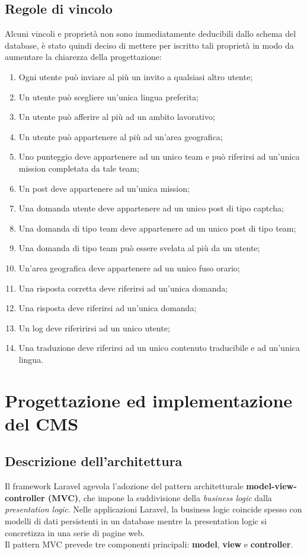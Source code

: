 \subsection{Regole di vincolo} %
Alcuni vincoli e proprietà non sono immediatamente deducibili dallo schema del database, è stato quindi deciso di mettere per iscritto tali proprietà in modo da aumentare la chiarezza della progettazione:
\begin{enumerate}
	\item Ogni utente può inviare al più un invito a qualsiasi altro utente;
	\item Un utente può scegliere un'unica lingua preferita;
	\item Un utente può afferire al più ad un ambito lavorativo;
	\item Un utente può appartenere al più ad un'area geografica;
	\item Uno punteggio deve appartenere ad un unico team e può riferirsi ad un'unica mission completata da tale team;
	\item Un post deve appartenere ad un'unica mission;
	\item Una domanda utente deve appartenere ad un unico post di tipo captcha;
	\item Una domanda di tipo team deve appartenere ad un unico post di tipo team;
	\item Una domanda di tipo team può essere svelata al più da un utente;
	\item Un'area geografica deve appartenere ad un unico fuso orario;
	\item Una risposta corretta deve riferirsi ad un'unica domanda;
	\item Una risposta deve riferirsi ad un'unica domanda;
	\item Un log deve riferirirsi ad un unico utente;
	\item Una traduzione deve riferirsi ad un unico contenuto traducibile e ad un'unica lingua.
\end{enumerate}

\section{Progettazione ed implementazione del CMS}
\subsection{Descrizione dell'architettura}
Il framework Laravel agevola l'adozione del pattern architetturale \textbf{model-view-controller (MVC)}, che impone la suddivisione della \textit{business logic} dalla \textit{presentation logic}. Nelle applicazioni Laravel, la business logic coincide spesso con modelli di dati persistenti in un database mentre la presentation logic si concretizza in una serie di pagine web. \\
Il pattern MVC prevede tre componenti principali: \textbf{model}, \textbf{view} e \textbf{controller}.

